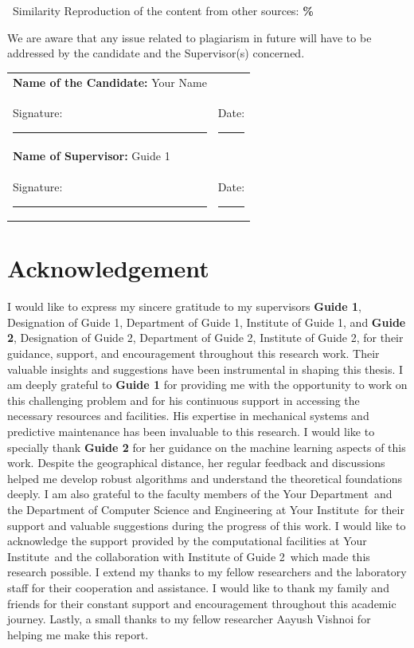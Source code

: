 \documentclass[12pt,a4paper]{report}
\newcommand{\authorname}{Your Name}
\newcommand{\guideIname}{Guide 1}
\newcommand{\guideItitle}{Designation of Guide 1}
\newcommand{\guideIdept}{Department of Guide 1}
\newcommand{\guideIinst}{Institute of Guide 1}
\newcommand{\guideIIname}{Guide 2}
\newcommand{\guideIItitle}{Designation of Guide 2}
\newcommand{\guideIIdept}{Department of Guide 2}
\newcommand{\guideIIinst}{Institute of Guide 2}
\newcommand{\departmentname}{Your Department}
\newcommand{\institutename}{Your Institute}
\begin{document}
\vspace{0.3cm}

\noindent \checkmark\ Similarity Reproduction of the content from other sources: \textbf{\%}

\vspace{0.5cm}

We are aware that any issue related to plagiarism in future will have to be addressed by the candidate and the Supervisor(s) concerned.
\vspace{0.5cm}

\noindent\begin{tabular}{@{}p{}p{}@{}}
\textbf{Name of the Candidate:} \authorname & \\[0.3cm]
Signature: \rule{3cm}{0.4pt} & Date: \rule{3cm}{0.4pt}\\[1.5cm]
\textbf{Name of Supervisor:} \guideIname & \\[0.3cm]
Signature: \rule{3cm}{0.4pt} & Date: \rule{3cm}{0.4pt}
\end{tabular}

\cleardoublepage
\chapter*{Acknowledgement}

I would like to express my sincere gratitude to my supervisors \textbf{\guideIname}, \guideItitle, \guideIdept, \guideIinst, and \textbf{\guideIIname}, \guideIItitle, \guideIIdept, \guideIIinst, for their guidance, support, and encouragement throughout this research work.
Their valuable insights and suggestions have been instrumental in shaping this thesis.
I am deeply grateful to \textbf{\guideIname} for providing me with the opportunity to work on this challenging problem and for his continuous support in accessing the necessary resources and facilities.
His expertise in mechanical systems and predictive maintenance has been invaluable to this research.
I would like to specially thank \textbf{\guideIIname} for her guidance on the machine learning aspects of this work.
Despite the geographical distance, her regular feedback and discussions helped me develop robust algorithms and understand the theoretical foundations deeply.
I am also grateful to the faculty members of the \departmentname\ and the Department of Computer Science and Engineering at \institutename\ for their support and valuable suggestions during the progress of this work.
I would like to acknowledge the support provided by the computational facilities at \institutename\ and the collaboration with \guideIIinst\ which made this research possible.
I extend my thanks to my fellow researchers and the laboratory staff for their cooperation and assistance.
I would like to thank my family and friends for their constant support and encouragement throughout this academic journey.
Lastly, a small thanks to my fellow researcher Aayush Vishnoi for helping me make this report.
\vspace{0.5cm}
\end{document}
